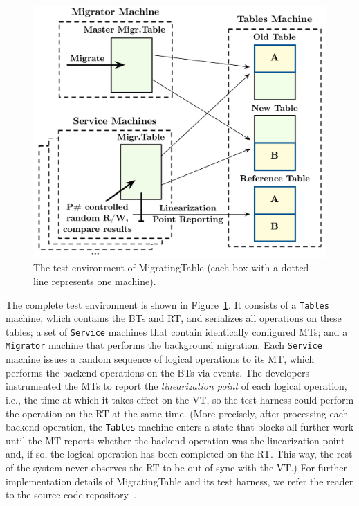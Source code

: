 \begin{figure}[t]
\centering
\includegraphics[width=\linewidth]{img/modeled_migration}
\vspace{-6mm}
\caption{The test environment of MigratingTable (each box with a dotted line represents one \psharp machine).}
\label{fig:mockedmigration}
\vspace{-2mm}
\end{figure}

The complete test environment is shown in Figure~\ref{fig:mockedmigration}. It consists of a \texttt{Tables} machine, which contains the BTs and RT, and serializes all operations on these tables; a set of \texttt{Service} machines that contain identically configured MTs; and a \texttt{Migrator} machine that performs the background migration. Each \texttt{Service} machine issues a random sequence of logical operations to its MT, which performs the backend operations on the BTs via \psharp events. The developers instrumented the MTs to report the \emph{linearization point} of each logical operation, i.e., the time at which it takes effect on the VT, so the test harness could perform the operation on the RT at the same time. (More precisely, after processing each backend operation, the \texttt{Tables} machine enters a \psharp state that blocks all further work until the MT reports whether the backend operation was the linearization point and, if so, the logical operation has been completed on the RT. This way, the rest of the system never observes the RT to be out of sync with the VT.) For further implementation details of MigratingTable and its test harness, we refer the reader to the source code repository~\cite{migratingtable-src}.

